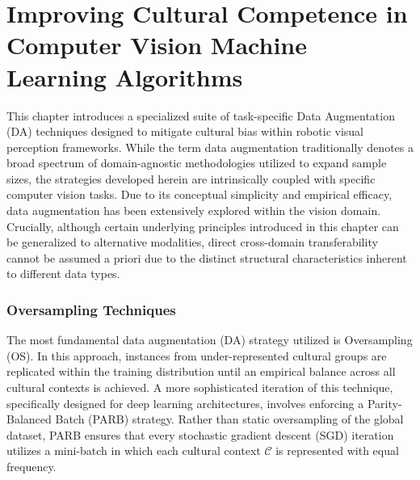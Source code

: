 
\chapter{Improving Cultural Competence in Computer Vision Machine Learning Algorithms}
\label{ch2v2}

\ifpdf
    \graphicspath{{Chapter2v2/Figs/Raster/}{Chapter2v2/Figs/PDF/}{Chapter2v2/Figs/}}
\else
    \graphicspath{{Chapter2v2/Figs/Vector/}{Chapter2v2/Figs/}}
\fi

%
This chapter introduces a specialized suite of task-specific Data Augmentation (DA) techniques designed to mitigate cultural bias within robotic visual perception frameworks. While the term data augmentation traditionally denotes a broad spectrum of domain-agnostic methodologies utilized to expand sample sizes, the strategies developed herein are intrinsically coupled with specific computer vision tasks. Due to its conceptual simplicity and empirical efficacy, data augmentation has been extensively explored within the vision domain. Crucially, although certain underlying principles introduced in this chapter can be generalized to alternative modalities, direct cross-domain transferability cannot be assumed a priori due to the distinct structural characteristics inherent to different data types.

\subsection{Oversampling Techniques}
\label{ch2:sec:os}
The most fundamental data augmentation (DA) strategy utilized is Oversampling (OS). 
In this approach, instances from under-represented cultural groups are replicated within the training distribution until an empirical balance across all cultural contexts is achieved.
A more sophisticated iteration of this technique, specifically designed for deep learning architectures, involves enforcing a Parity-Balanced Batch (PARB) strategy. 
Rather than static oversampling of the global dataset, PARB ensures that every stochastic gradient descent (SGD) iteration utilizes a mini-batch in which each cultural context $\mathcal{C}$ is represented with equal frequency.

